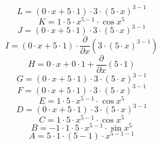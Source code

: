 \documentclass[12pt]{article}
\begin{document}
\begin{equation}
	L = 
\left( 0\cdot x + 5\cdot 1\right) \cdot 3\cdot \left( 5\cdot x\right) ^{3 - 1}
\end{equation}
\begin{equation}
	K = 
1\cdot 5\cdot x^{5 - 1}\cdot \cos {x^{5}}
\end{equation}
\begin{equation}
	J = 
\left( 0\cdot x + 5\cdot 1\right) \cdot 3\cdot \left( 5\cdot x\right) ^{3 - 1}
\end{equation}
\begin{equation}
	I = 
\left( 0\cdot x + 5\cdot 1\right) \cdot \frac{\partial}{\partial x}\left( 3\cdot \left( 5\cdot x\right) ^{3 - 1}\right) 
\end{equation}
\begin{equation}
	H = 
0\cdot x + 0\cdot 1 + \frac{\partial}{\partial x}\left( 5\cdot 1\right) 
\end{equation}
\begin{equation}
	G = 
\left( 0\cdot x + 5\cdot 1\right) \cdot 3\cdot \left( 5\cdot x\right) ^{3 - 1}
\end{equation}
\begin{equation}
	F = 
\left( 0\cdot x + 5\cdot 1\right) \cdot 3\cdot \left( 5\cdot x\right) ^{3 - 1}
\end{equation}
\begin{equation}
	E = 
1\cdot 5\cdot x^{5 - 1}\cdot \cos {x^{5}}
\end{equation}
\begin{equation}
	D = 
\left( 0\cdot x + 5\cdot 1\right) \cdot 3\cdot \left( 5\cdot x\right) ^{3 - 1}
\end{equation}
\begin{equation}
	C = 
1\cdot 5\cdot x^{5 - 1}\cdot \cos {x^{5}}
\end{equation}
\begin{equation}
	B = 
-1\cdot 1\cdot 5\cdot x^{5 - 1}\cdot \sin {x^{5}}
\end{equation}
\begin{equation}
	A = 
5\cdot 1\cdot \left( 5 - 1\right) \cdot x^{5 - 1 - 1}
\end{equation}
\end{document}
